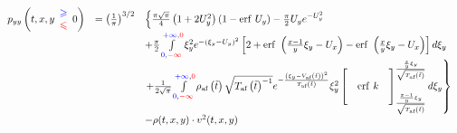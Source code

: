 \begin{equation*}
\begin{array}{ r l l }
p_{yy}\left( t,x,y\begin{array}{ c }
\textcolor[rgb]{0,0,1}{\geqslant }\\
\textcolor[rgb]{1,0,0}{\leqslant }
\end{array} 0\right) & =\left(\frac{1}{\pi }\right)^{3/2} & \left\{\frac{\pi \sqrt{\pi }}{4}\left( 1+2U_{y}^{2}\right)( 1-\mathrm{erf} \ U_{y}) -\frac{\pi }{2} U_{y} e^{-U_{y}^{2}}\right. \\
 &  & +\frac{\pi }{2}\int\limits _{\textcolor[rgb]{0,0,1}{0} ,\textcolor[rgb]{1,0,0}{-\infty }}^{\textcolor[rgb]{0,0,1}{+\infty } ,\textcolor[rgb]{1,0,0}{0}} \xi _{y}^{2} e^{-( \xi _{y} -U_{y})^{2}}\left[ 2+\mathrm{erf} \ \left(\frac{x-1}{y} \xi _{y} -U_{x}\right) -\mathrm{erf} \ \left(\frac{x}{y} \xi _{y} -U_{x}\right)\right] d\xi _{y}\\
 &  & \left. +\frac{1}{2\sqrt{\pi }}\int\limits _{\textcolor[rgb]{0,0,1}{0} ,\textcolor[rgb]{1,0,0}{-\infty }}^{\textcolor[rgb]{0,0,1}{+\infty } ,\textcolor[rgb]{1,0,0}{0}} \rho _{\text{af}}\left(\tilde{t}\right)\sqrt{T_{\text{af}}\left(\tilde{t}\right)^{-1}} e^{-\frac{\left( \xi _{y} -V_{\text{af}}\left(\tilde{t}\right)\right)^{2}}{T_{\text{af}}\left(\tilde{t}\right)}} \xi _{y}^{2}\left[\begin{array}{ c }
 \\\\
 \\
\end{array}\mathrm{erf} \ k\begin{array}{ c }
 \\\\
 \\
\end{array}\right]_{\frac{\frac{x-1}{y} \xi _{y}}{\sqrt{T_{\text{af}}\left(\tilde{t}\right)}}}^{\frac{\frac{x}{y} \xi _{y}}{\sqrt{T_{\text{af}}\left(\tilde{t}\right)}}} d\xi _{y}\right\}\\
 &  & -\rho (t,x,y)\cdot v^{2} (t,x,y)
\end{array}
\end{equation*}

